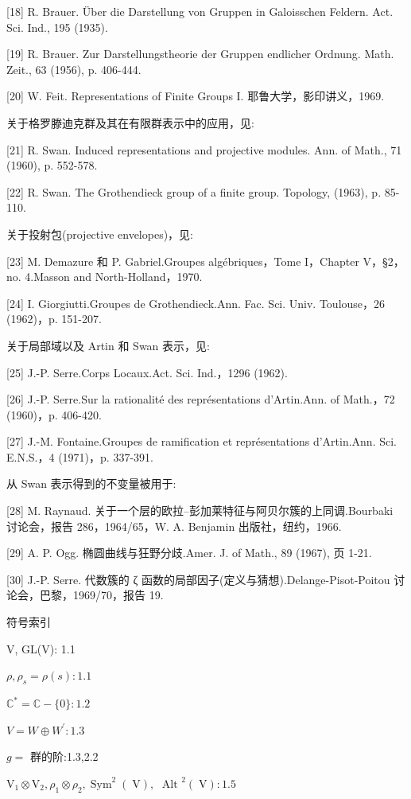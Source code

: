 \documentclass[10pt]{article}
\begin{document}
[18] R. Brauer. Über die Darstellung von Gruppen in Galoisschen Feldern. Act. Sci. Ind., 195 (1935).

[19] R. Brauer. Zur Darstellungstheorie der Gruppen endlicher Ordnung. Math. Zeit., 63 (1956), p. 406-444.

[20] W. Feit. Representations of Finite Groups I. 耶鲁大学，影印讲义，1969.

关于格罗滕迪克群及其在有限群表示中的应用，见:

[21] R. Swan. Induced representations and projective modules. Ann. of Math., 71 (1960), p. 552-578.

[22] R. Swan. The Grothendieck group of a finite group. Topology, (1963), p. 85-110.

关于投射包(projective envelopes)，见:

[23] M. Demazure 和 P. Gabriel.Groupes algébriques，Tome I，Chapter V，§2，no. 4.Masson and North-Holland，1970.

[24] I. Giorgiutti.Groupes de Grothendieck.Ann. Fac. Sci. Univ. Toulouse，26 (1962)，p. 151-207.

关于局部域以及 Artin 和 Swan 表示，见:

[25] J.-P. Serre.Corps Locaux.Act. Sci. Ind.，1296 (1962).

[26] J.-P. Serre.Sur la rationalité des représentations d'Artin.Ann. of Math.，72 (1960)，p. 406-420.

[27] J.-M. Fontaine.Groupes de ramification et représentations d'Artin.Ann. Sci. E.N.S.，4 (1971)，p. 337-391.

从 Swan 表示得到的不变量被用于:

[28] M. Raynaud. 关于一个层的欧拉–彭加莱特征与阿贝尔簇的上同调.Bourbaki 讨论会，报告 286，1964/65，W. A. Benjamin 出版社，纽约，1966.

[29] A. P. Ogg. 椭圆曲线与狂野分歧.Amer. J. of Math., 89 (1967), 页 1-21.

[30] J.-P. Serre. 代数簇的 ζ 函数的局部因子(定义与猜想).Delange-Pisot-Poitou 讨论会，巴黎，1969/70，报告 19.

符号索引

V, GL(V): 1.1

\(\rho ,{\rho }_{s} = \rho \left( s\right)  : {1.1}\)

\({\mathbb{C}}^{ * } = \mathbb{C} - \{ 0\}  : {1.2}\)

\(V = W \oplus  {W}^{\prime } : {1.3}\)

\(g =\) 群的阶:1.3,2.2

\({\mathrm{V}}_{1} \otimes  {\mathrm{V}}_{2},{\rho }_{1} \otimes  {\rho }_{2},{\operatorname{Sym}}^{2}\left( \mathrm{\;V}\right) , \; {\text{ Alt }}^{2}\left( \mathrm{\;V}\right)  : {1.5}\)
\end{document}
